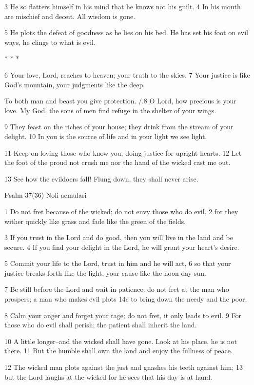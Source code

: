 3 He so flatters himself in his mind
that he knows not his guilt.
4 In his mouth are mischief and deceit.
All wisdom is gone.

5 He plots the defeat of goodness
as he lies on his bed.
He has set his foot on evil ways,
he clings to what is evil.

* * *

6 Your love, Lord, reaches to heaven;
your truth to the skies.
7 Your justice is like God's mountain,
your judgments like the deep.

To both man and beast you give protection.
/.8 O Lord, how precious is your love.
My God, the sons of men
find refuge in the shelter of your wings.

9 They feast on the riches of your house;
they drink from the stream of your delight.
10 In you is the source of life
and in your light we see light.

11 Keep on loving those who know you,
doing justice for upright hearts.
12 Let the foot of the proud not crush me
nor the hand of the wicked cast me out.

13 See how the evildoers fall!
Flung down, they shall never arise.


Psalm 37(36) Noli aemulari

1 Do not fret because of the wicked;
do not envy those who do evil,
2 for they wither quickly like grass
and fade like the green of the fields.

3 If you trust in the Lord and do good,
then you will live in the land and be secure.
4 If you find your delight in the Lord,
he will grant your heart's desire.

5 Commit your life to the Lord,
trust in him and he will act,
6 so that your justice breaks forth like the light,
your cause like the noon-day sun.

7 Be still before the Lord and wait in patience;
do not fret at the man who prospers;
a man who makes evil plots
14c to bring down the needy and the poor.

8 Calm your anger and forget your rage;
do not fret, it only leads to evil.
9 For those who do evil shall perish;
the patient shall inherit the land.

10 A little longer--and the wicked shall have gone.
Look at his place, he is not there.
11 But the humble shall own the land
and enjoy the fullness of peace.

12 The wicked man plots against the just
and gnashes his teeth against him;
13 but the Lord laughs at the wicked
for he sees that his day is at hand.


